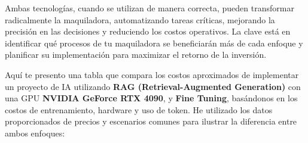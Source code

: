 \documentclass[
  10pt,
  letterpaper,
]{book}
\begin{document}
Ambas tecnologías, cuando se utilizan de manera correcta, pueden
transformar radicalmente la maquiladora, automatizando tareas críticas,
mejorando la precisión en las decisiones y reduciendo los costos
operativos. La clave está en identificar qué procesos de tu maquiladora
se beneficiarán más de cada enfoque y planificar su implementación para
maximizar el retorno de la inversión.

Aquí te presento una tabla que compara los costos aproximados de
implementar un proyecto de IA utilizando \textbf{RAG
(Retrieval-Augmented Generation)} con una GPU \textbf{NVIDIA GeForce RTX
4090}, y \textbf{Fine Tuning}, basándonos en los costos de
entrenamiento, hardware y uso de token. He utilizado los datos
proporcionados de precios y escenarios comunes para ilustrar la
diferencia entre ambos enfoques:
\end{document}
